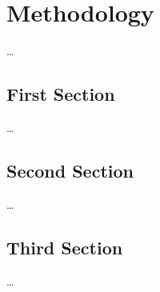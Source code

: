 
\chapter{Methodology}
\label{ch:EvalMethodologyuation}

\dots

\section{First Section}
\label{sec:Methodology:FirstSection}

\dots

\section{Second Section}
\label{sec:Analysis:SecondSection}

\dots

\section{Third Section}
\label{sec:Analysis:ThirdSection}

\dots
